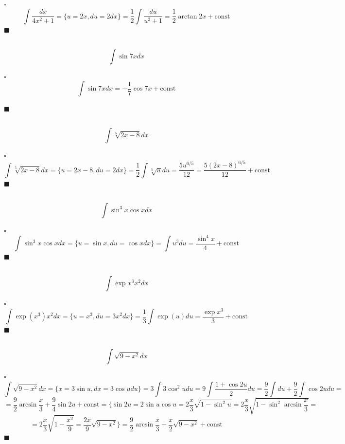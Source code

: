 \documentclass[a4paper]{article}
\newcommand{\solutionstart}{{\noindent $\square$ \\}}
\newcommand{\solutionend}{{\noindent $\blacksquare$ \\}}
\begin{document}
\solutionstart
\[
\int \frac{dx}{4 x^2 + 1} = \Biggl\{ u = 2x, du = 2dx \Biggr\} = \frac1{2} \int \frac{du}{u^2 + 1} = \frac1{2} \arctan{2x} + \text{const}
\]
\solutionend


\subsection{}
\[
\int \sin{7x} dx
\]

\solutionstart
\[
\int \sin{7x} dx = -\frac1{7} \cos{7x} + \text{const}
\]

\solutionend


\subsection{}
\[
\int \sqrt[5]{2x - 8} dx 
\]

\solutionstart
\[
\int \sqrt[5]{2x - 8} dx = \Biggl\{ u = 2x - 8, du = 2 dx \Biggr\} = \frac1{2} \int \sqrt[5]{u} du = \frac{5 u^{6/5}}{12} = \frac{5 (2x - 8)^{6/5}}{12} + \text{const}
\]
\solutionend

\subsection{}
\[
\int \sin^3{x} \cos{x} dx 
\]

\solutionstart
\[
\int \sin^3{x} \cos{x} dx = \Biggl\{ u = \sin{x}, du = \cos{x} dx \Biggr\} = \int u^3 du = \frac{\sin^4{x}}{4} + \text{const}
\]
\solutionend

\subsection{}
\[
\int \exp{x^3} x^2 dx 
\]

\solutionstart
\[
\int \exp(x^3) x^2 dx =  \Biggl\{ u = x^3, du = 3x^2 dx \Biggr\} = \frac1{3} \int \exp(u) du = \frac{\exp{x^3}}{3} + \text{const}
\]
\solutionend

\subsection{}
\[
\int \sqrt{9 - x^2} dx 
\]

\solutionstart
\[
\int \sqrt{9 - x^2} dx = \Biggl\{ x = 3 \sin{u}, dx = 3 \cos{u} du \Biggr\} = 3 \int 3 \cos^2{u} du = 9 \int \frac{1 + \cos{2u}}{2} du = \frac{9}{2} \int du + \frac{9}{2} \int \cos{2u} du = 
\]
\[
= \frac{9}{2} \arcsin{\frac{x}{3}} + \frac{9}{4} \sin{2u} + \text{const} =  \Biggl\{ \sin{2u} = 2 \sin{u} \cos{u} = 2 \frac{x}{3} \sqrt{1 - \sin^2{u}} = 2 \frac{x}{3} \sqrt{1 - \sin^2{\arcsin{\frac{x}{3}}}} =
\]
\[
= 2 \frac{x}{3} \sqrt{1 - \frac{x^2}{9}} = \frac{2x}{9} \sqrt{9 - x^2} \Bigr\} = \frac{9}{2} \arcsin{\frac{x}{3}} + \frac{x}{2} \sqrt{9 - x^2} + \text{const}
\]
\solutionend
\end{document}
